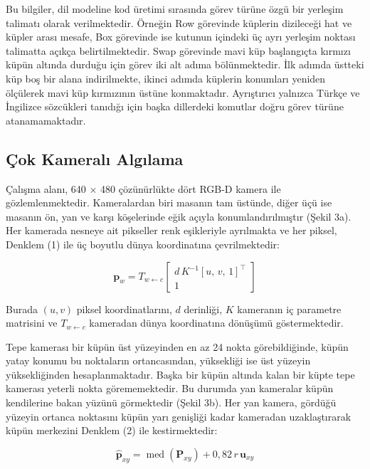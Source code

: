 \documentclass[preprint,12pt]{elsarticle}
\begin{document}
Bu bilgiler, dil modeline kod üretimi sırasında görev türüne özgü bir yerleşim talimatı olarak verilmektedir. Örneğin Row görevinde küplerin dizileceği hat ve küpler arası mesafe, Box görevinde ise kutunun içindeki üç ayrı yerleşim noktası talimatta açıkça belirtilmektedir. Swap görevinde mavi küp başlangıçta kırmızı küpün altında durduğu için görev iki alt adıma bölünmektedir. İlk adımda üstteki küp boş bir alana indirilmekte, ikinci adımda küplerin konumları yeniden ölçülerek mavi küp kırmızının üstüne konmaktadır. Ayrıştırıcı yalnızca Türkçe ve İngilizce sözcükleri tanıdığı için başka dillerdeki komutlar doğru görev türüne atanamamaktadır.

\hypertarget{uxe7ok-kameralux131-algux131lama}{%
\subsection{Çok Kameralı Algılama}\label{uxe7ok-kameralux131-algux131lama}}

Çalışma alanı, 640 $\times$ 480 çözünürlükte dört RGB-D kamera ile gözlemlenmektedir. Kameralardan biri masanın tam üstünde, diğer üçü ise masanın ön, yan ve karşı köşelerinde eğik açıyla konumlandırılmıştır (Şekil 3a). Her kamerada nesneye ait pikseller renk eşikleriyle ayrılmakta ve her piksel, Denklem (1) ile üç boyutlu dünya koordinatına çevrilmektedir:

\begin{equation}
\mathbf{p}_w = T_{w \leftarrow c}\begin{bmatrix} d\,K^{-1}[u,\, v,\, 1]^\top \\ 1 \end{bmatrix}
\label{eq:1}
\end{equation}

Burada \((u, v)\) piksel koordinatlarını, \(d\) derinliği, \(K\) kameranın iç parametre matrisini ve \(T_{w \leftarrow c}\) kameradan dünya koordinatına dönüşümü göstermektedir.

Tepe kamerası bir küpün üst yüzeyinden en az 24 nokta görebildiğinde, küpün yatay konumu bu noktaların ortancasından, yüksekliği ise üst yüzeyin yüksekliğinden hesaplanmaktadır. Başka bir küpün altında kalan bir küpte tepe kamerası yeterli nokta görememektedir. Bu durumda yan kameralar küpün kendilerine bakan yüzünü görmektedir (Şekil 3b). Her yan kamera, gördüğü yüzeyin ortanca noktasını küpün yarı genişliği kadar kameradan uzaklaştırarak küpün merkezini Denklem (2) ile kestirmektedir:

\begin{equation}
\hat{\mathbf{p}}_{xy} = \operatorname{med}(\mathbf{P}_{xy}) + 0{,}82\, r\, \mathbf{u}_{xy}
\label{eq:2}
\end{equation}
\end{document}
